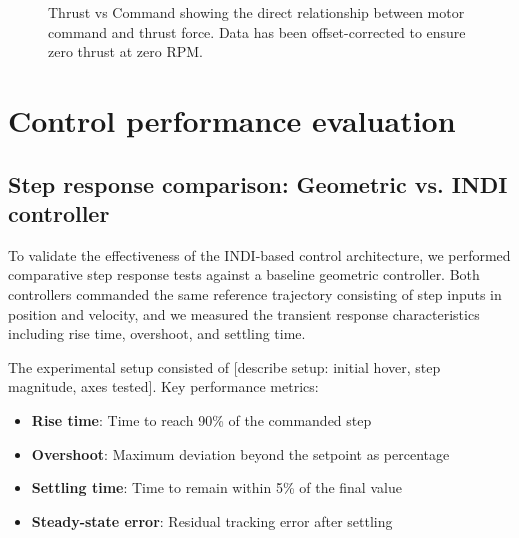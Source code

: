 \begin{figure}[htbp]
  \centering
  \caption{Thrust vs Command showing the direct relationship between motor command and thrust force. Data has been offset-corrected to ensure zero thrust at zero RPM.}
  \label{fig:thrust_vs_cmd}
\end{figure}

\section{Control performance evaluation}

\subsection{Step response comparison: Geometric vs. INDI controller}

To validate the effectiveness of the INDI-based control architecture, we performed comparative step response tests against a baseline geometric controller. Both controllers commanded the same reference trajectory consisting of step inputs in position and velocity, and we measured the transient response characteristics including rise time, overshoot, and settling time.

The experimental setup consisted of [describe setup: initial hover, step magnitude, axes tested]. Key performance metrics:

\begin{itemize}
  \item \textbf{Rise time}: Time to reach 90\% of the commanded step
  \item \textbf{Overshoot}: Maximum deviation beyond the setpoint as percentage
  \item \textbf{Settling time}: Time to remain within 5\% of the final value
  \item \textbf{Steady-state error}: Residual tracking error after settling
\end{itemize}

